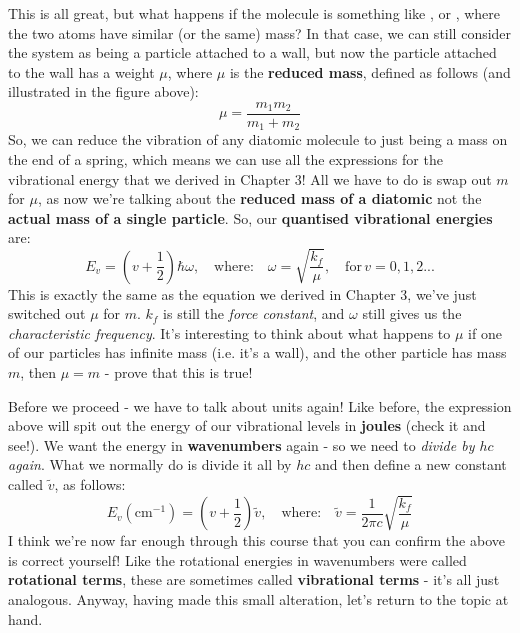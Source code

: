 \documentclass{memoir}[11pt,oneside,a4paper,openany]
\begin{document}
This is all great, but what happens if the molecule is something like , or , where the two atoms have similar (or the same) mass? In that case, we can still consider the system as being a particle attached to a wall, but now the particle attached to the wall has a weight $\mu$, where $\mu$ is the \textbf{reduced mass}, defined as follows (and illustrated in the figure above):
\begin{equation}
	\mu = \frac{m_1m_2}{m_1+m_2}
\end{equation}
So, we can reduce the vibration of any diatomic molecule to just being a mass on the end of a spring, which means we can use all the expressions for the vibrational energy that we derived in Chapter 3! All we have to do is swap out $m$ for $\mu$, as now we're talking about the \textbf{reduced mass of a diatomic} not the \textbf{actual mass of a single particle}. So, our \textbf{quantised vibrational energies} are:
\begin{equation}
	E_v = (v+\frac{1}{2})\hbar\omega,\quad \text{where:}\quad \omega = \sqrt{\frac{k_f}{\mu}},\quad\text{for}\,v=0,1,2...
\end{equation}
This is exactly the same as the equation we derived in Chapter 3, we've just switched out $\mu$ for $m$. $k_f$ is still the \emph{force constant}, and $\omega$ still gives us the \emph{characteristic frequency}. It's interesting to think about what happens to $\mu$ if one of our particles has infinite mass (i.e. it's a wall), and the other particle has mass $m$, then $\mu=m$ - prove that this is true!

Before we proceed - we have to talk about units again! Like before, the expression above will spit out the energy of our vibrational levels in \textbf{joules} (check it and see!). We want the energy in \textbf{wavenumbers} again - so we need to \emph{divide by $hc$ again}. What we normally do is divide it all by $hc$ and then define a new constant called $\tilde{v}$, as follows:
\begin{equation}
	E_v (\text{cm}^{-1}) = (v+\frac{1}{2})\tilde{v},\quad \text{where:}\quad \tilde{v} = \frac{1}{2\pi c}\sqrt{\frac{k_f}{\mu}}
\end{equation}
I think we're now far enough through this course that you can confirm the above is correct yourself! Like the rotational energies in wavenumbers were called \textbf{rotational terms}, these are sometimes called \textbf{vibrational terms} - it's all just analogous. Anyway, having made this small alteration, let's return to the topic at hand.
\end{document}
